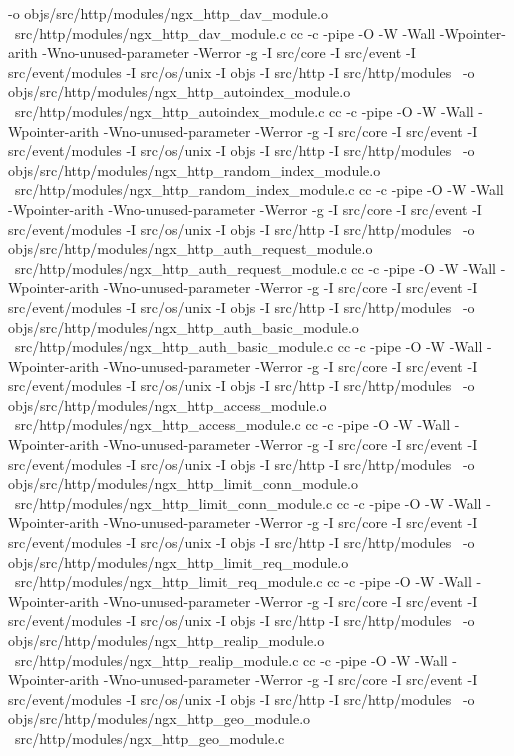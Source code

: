 	-o objs/src/http/modules/ngx_http_dav_module.o \
	src/http/modules/ngx_http_dav_module.c
cc -c -pipe  -O -W -Wall -Wpointer-arith -Wno-unused-parameter -Werror -g  -I src/core -I src/event -I src/event/modules -I src/os/unix -I objs -I src/http -I src/http/modules \
	-o objs/src/http/modules/ngx_http_autoindex_module.o \
	src/http/modules/ngx_http_autoindex_module.c
cc -c -pipe  -O -W -Wall -Wpointer-arith -Wno-unused-parameter -Werror -g  -I src/core -I src/event -I src/event/modules -I src/os/unix -I objs -I src/http -I src/http/modules \
	-o objs/src/http/modules/ngx_http_random_index_module.o \
	src/http/modules/ngx_http_random_index_module.c
cc -c -pipe  -O -W -Wall -Wpointer-arith -Wno-unused-parameter -Werror -g  -I src/core -I src/event -I src/event/modules -I src/os/unix -I objs -I src/http -I src/http/modules \
	-o objs/src/http/modules/ngx_http_auth_request_module.o \
	src/http/modules/ngx_http_auth_request_module.c
cc -c -pipe  -O -W -Wall -Wpointer-arith -Wno-unused-parameter -Werror -g  -I src/core -I src/event -I src/event/modules -I src/os/unix -I objs -I src/http -I src/http/modules \
	-o objs/src/http/modules/ngx_http_auth_basic_module.o \
	src/http/modules/ngx_http_auth_basic_module.c
cc -c -pipe  -O -W -Wall -Wpointer-arith -Wno-unused-parameter -Werror -g  -I src/core -I src/event -I src/event/modules -I src/os/unix -I objs -I src/http -I src/http/modules \
	-o objs/src/http/modules/ngx_http_access_module.o \
	src/http/modules/ngx_http_access_module.c
cc -c -pipe  -O -W -Wall -Wpointer-arith -Wno-unused-parameter -Werror -g  -I src/core -I src/event -I src/event/modules -I src/os/unix -I objs -I src/http -I src/http/modules \
	-o objs/src/http/modules/ngx_http_limit_conn_module.o \
	src/http/modules/ngx_http_limit_conn_module.c
cc -c -pipe  -O -W -Wall -Wpointer-arith -Wno-unused-parameter -Werror -g  -I src/core -I src/event -I src/event/modules -I src/os/unix -I objs -I src/http -I src/http/modules \
	-o objs/src/http/modules/ngx_http_limit_req_module.o \
	src/http/modules/ngx_http_limit_req_module.c
cc -c -pipe  -O -W -Wall -Wpointer-arith -Wno-unused-parameter -Werror -g  -I src/core -I src/event -I src/event/modules -I src/os/unix -I objs -I src/http -I src/http/modules \
	-o objs/src/http/modules/ngx_http_realip_module.o \
	src/http/modules/ngx_http_realip_module.c
cc -c -pipe  -O -W -Wall -Wpointer-arith -Wno-unused-parameter -Werror -g  -I src/core -I src/event -I src/event/modules -I src/os/unix -I objs -I src/http -I src/http/modules \
	-o objs/src/http/modules/ngx_http_geo_module.o \
	src/http/modules/ngx_http_geo_module.c
